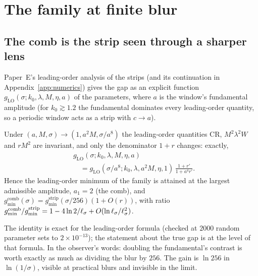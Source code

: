 \section{The family at finite blur}
\label{sec:finite}

\subsection{The comb is the strip seen through a sharper lens}
Paper~E's leading-order analysis of the strips (and its continuation in Appendix~\ref{app:numerics}) gives the gap as an explicit function
$g_{\mathrm{LO}}(\sigma;k_0,\lambda,M,\eta,a)$ of the parameters, where $a$ is the window's fundamental amplitude (for $k_0\gtrsim1.2$ the
fundamental dominates every leading-order quantity, so a periodic window acts as a strip with $c\to a$).

\begin{proposition} \derivst
\label{prop:BE1}
Under $(a,M,\sigma)\to(1,a^2M,\sigma/a^8)$ the leading-order quantities $\mathrm{CR}$, $M^2\lambda^2W$ and $rM^2$ are invariant, and only the
denominator $1+r$ changes: exactly,
\begin{equation}
\begin{aligned}&g_{\mathrm{LO}}(\sigma;k_0,\lambda,M,\eta,a)\\&\quad=g_{\mathrm{LO}}(\sigma/a^8;k_0,\lambda,a^2M,\eta,1)\,\frac{1+r'}{1+a^4r'} .\end{aligned}
\end{equation}
Hence the leading-order minimum of the family is attained at the largest admissible amplitude, $a_1=2$ (the comb), and
$g^{\mathrm{comb}}_{\min}(\sigma)=g^{\mathrm{strip}}_{\min}(\sigma/256)(1+O(r))$, with ratio
$g^{\mathrm{comb}}_{\min}/g^{\mathrm{strip}}_{\min}=1-4\ln2/\ell_\sigma+O(\ln\ell_\sigma/\ell_\sigma^2)$.
\end{proposition}

The identity is exact for the leading-order formula (checked at $2000$ random parameter sets to $2\times10^{-13}$); the statement about the
true gap is at the level of that formula. In the observer's words: doubling the fundamental's contrast is worth exactly as much as dividing
the blur by $256$. The gain is $\ln256$ in $\ln(1/\sigma)$, visible at practical blurs and invisible in the limit.

